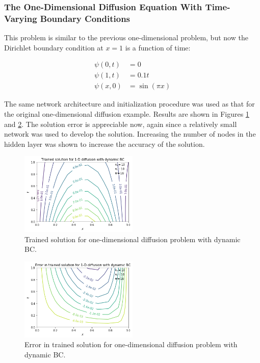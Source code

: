 \documentclass{article}
\begin{document}
\subsubsection{The One-Dimensional Diffusion Equation With Time-Varying Boundary Conditions}

This problem is similar to the previous one-dimensional problem, but now the Dirichlet boundary condition at $x=1$ is a function of time:

\begin{equation}
\begin{split}
  \psi(0,t) &= 0 \\
  \psi(1,t) &= 0.1 t\\
  \psi(x,0) &= \sin(\pi x)
\end{split}
\end{equation}


The same network architecture and initialization procedure was used as that for the original one-dimensional diffusion example. Results are shown in Figures \ref{fig:diff1d_dynamicBC_trained} and \ref{fig:diff1d_dynamicBC_error}. The solution error is appreciable now, again since a relatively small network was used to develop the solution. Increasing the number of nodes in the hidden layer was shown to increase the accuracy of the solution.

\begin{figure}
    \centering
    \includegraphics[width=0.5\textwidth]{figures/diff1d_dynamicBC_trained.png}
    \caption{Trained solution for one-dimensional diffusion problem with dynamic BC.}
    \label{fig:diff1d_dynamicBC_trained}
\end{figure}

\begin{figure}
    \centering
    \includegraphics[width=0.5\textwidth]{figures/diff1d_dynamicBC_error.png}
    \caption{Error in trained solution for one-dimensional diffusion problem with dynamic BC.}
    \label{fig:diff1d_dynamicBC_error}
\end{figure}
\end{document}
